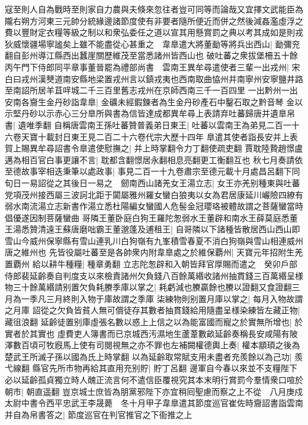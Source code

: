 寇至則人自為戰時至則家自力農與夫倏來忽往者豈可同等而論哉又宜擇文武能臣為隴右朔方河東三元帥分統緣邊諸節度使有非要者隨所便近而併之然後減姦濫虛浮之費以豐財定衣糧等級之制以和衆弘委任之道以宣其用懸賞罰之典以考其成如是則戎狄威懷疆場寧謐矣上雖不能盡從心甚重之　韋臯遣大將董勔等將兵出西山|{
	勔彌兖翻自彭州導江縣西出蠶崖關歷維茂至當悉諸州皆西山也}
破吐蕃之衆拔堡柵五十餘　丙午門下侍郎同平章事董晉罷為禮部尚書　雲南王異牟尋遣使者三輩一出戎州|{
	宋白曰戎州漢僰道南安縣地梁置戎州言以鎮戎夷也西南取曲恊州并南寧州安寧鹽井路至南詔所居羊苴哶城二千三百里舊志戎州在京師西南三千一百四里}
一出黔州一出安南各齎生金丹砂詣韋臯|{
	金礦未經鍜鍊者為生金丹砂產石中鑿石取之黔音琴}
金以示堅丹砂以示赤心三分臯所與書為信皆達成都異牟尋上表請弃吐蕃歸唐并遺臯帛書|{
	遺唯季翻}
自稱唐雲南王孫吐蕃贊普義弟日東王|{
	吐蕃以雲南王為弟見二百一十六卷天寶十載封日東王見二百二十六卷代宗大歷十四年}
臯遣其使者詣長安并上表賀上賜異牟尋詔書令臯遣使慰撫之|{
	并上時掌翻令力丁翻使疏吏翻}
賈耽陸贄趙憬盧邁為相百官白事更讓不言|{
	耽都含翻憬居永翻相息亮翻更工衡翻互也}
秋七月奏請依至德故事宰相迭秉筆以處政事|{
	事見二百一十九卷肅宗至德元載十月處昌呂翻下同}
旬日一易詔從之其後日一易之　劒南西山諸羌女王湯立志|{
	女王亦羌别種東與吐蕃党項茂州接西屬三波訶北距于闐屬雅州羅女蠻白狼夷以女為君居康延川巗險四繚有弱水南流湯立志新書作湯立悉杜陽編女蠻國人危髻金冠瓔珞被體故謂之菩薩蠻當時倡優遂因制菩薩蠻曲}
哥隣王董卧庭白狗王羅陀怱弱水王董辟和南水王薛莫庭悉董王湯悉贊清遠王蘇唐磨咄霸王董邈蓬及逋租王|{
	自哥隣以下諸種皆散居西山西山即雪山今威州保寧縣有雪山連乳川白狗嶺有九峯積雪春夏不消白狗嶺與雪山相連威州唐之維州也}
先皆役屬吐蕃至是各帥衆内附韋臯處之於維保覇州|{
	天寶元年招附生羌置覇州}
給以耕牛種糧|{
	種章勇翻}
立志陀怱辟和入朝皆拜官厚賜而遣之　癸卯戶部侍郎裴延齡奏自判度支以來檢責諸州欠負錢八百餘萬緡收諸州抽貫錢三百萬緡呈様物三十餘萬緡請别置欠負耗賸季庫以掌之|{
	耗虧減也賸贏餘也賸以證翻又食證翻三月為一季凡三月終則入物于庫故謂之季庫}
柒練物則别置月庫以掌之|{
	每月入物故謂之月庫}
詔從之欠負皆貧人無可償徒存其數者抽貫錢給用隨盡呈様染練皆左藏正物|{
	藏徂浪翻}
延齡徒置别庫虛張名數以惑上上信之以為能富國而寵之於實無所增也|{
	於實者於其實也}
虛費吏人簿書而已京城西汚濕地生蘆葦數畝延齡奏稱長安咸陽有陂澤數百頃可牧廐馬上使有司閱視無之亦不罪也左補闕權德輿上奏|{
	權本顓頊之後為楚武王所滅子孫以國為氏上時掌翻}
以為延齡取常賦支用未盡者充羨餘以為己功|{
	羨弋線翻}
縣官先所市物再給其直用充别貯|{
	貯丁呂翻}
邊軍自今春以來並不支糧陛下必以延齡孤貞獨立時人醜正流言何不遣信臣覆視究其本末明行賞罰今羣情衆口喧於朝市|{
	朝直遥翻}
豈京城士庶皆為朋黨邪陛下亦宜稍囘聖慮而察之上不從　八月庚戍太尉中書令西平忠武王李晟薨　冬十月甲子韋臯遣其節度巡官崔佐時齎詔書詣雲南并自為帛書答之|{
	節度巡官在判官推官之下衙推之上}
